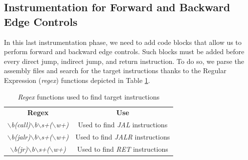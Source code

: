 \subsection{Instrumentation for Forward and Backward Edge Controls}
\label{subsec:project_instrcontrols}

In this last instrumentation phase, we need to add code blocks that allow us to perform
forward and backward edge controls. Such blocks must be added before every
direct jump, indirect jump, and return instruction. To do so, we parse the
assembly files and search for the target instructions thanks to the Regular
Expression (\textit{regex}) functions depicted in Table \ref{tab:regexes}.

\begin{table}
  \centering
  \begin{tabular}{|c|c|}
    \hline
    \textbf{Regex}                                                                      & \textbf{Use}                            \\
    \hhline{==} \textit{$\backslash$b(call)$\backslash$b$\backslash$s+($\backslash$w+)} & Used to find \textit{JAL} instructions  \\
    \hline
    \textit{$\backslash$b(jalr)$\backslash$b$\backslash$s+($\backslash$w+)}             & Used to find \textit{JALR} instructions \\
    \hline
    \textit{$\backslash$b(jr)$\backslash$b$\backslash$s+($\backslash$w+)}               & Used to find \textit{RET} instructions  \\
    \hline
  \end{tabular}
  \caption{\textit{Regex} functions used to find target instructions}
  \label{tab:regexes}
\end{table}

